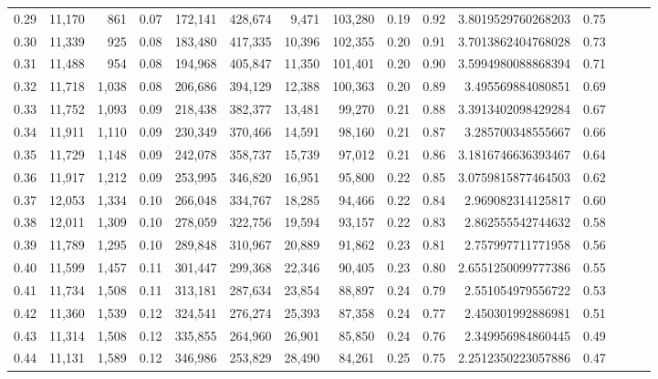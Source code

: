 \begin{tabular}{rrrrrrrrrrrrrrr}
0.29 &  11,170 &    861 &  0.07 &  172,141 &  428,674 &    9,471 &  103,280 &  0.19 &  0.92 &     3.8019529760268203 &      0.75 \\
0.30 &  11,339 &    925 &  0.08 &  183,480 &  417,335 &   10,396 &  102,355 &  0.20 &  0.91 &     3.7013862404768028 &      0.73 \\
0.31 &  11,488 &    954 &  0.08 &  194,968 &  405,847 &   11,350 &  101,401 &  0.20 &  0.90 &     3.5994980088868394 &      0.71 \\
0.32 &  11,718 &  1,038 &  0.08 &  206,686 &  394,129 &   12,388 &  100,363 &  0.20 &  0.89 &      3.495569884080851 &      0.69 \\
0.33 &  11,752 &  1,093 &  0.09 &  218,438 &  382,377 &   13,481 &   99,270 &  0.21 &  0.88 &     3.3913402098429284 &      0.67 \\
0.34 &  11,911 &  1,110 &  0.09 &  230,349 &  370,466 &   14,591 &   98,160 &  0.21 &  0.87 &      3.285700348555667 &      0.66 \\
0.35 &  11,729 &  1,148 &  0.09 &  242,078 &  358,737 &   15,739 &   97,012 &  0.21 &  0.86 &     3.1816746636393467 &      0.64 \\
0.36 &  11,917 &  1,212 &  0.09 &  253,995 &  346,820 &   16,951 &   95,800 &  0.22 &  0.85 &     3.0759815877464503 &      0.62 \\
0.37 &  12,053 &  1,334 &  0.10 &  266,048 &  334,767 &   18,285 &   94,466 &  0.22 &  0.84 &      2.969082314125817 &      0.60 \\
0.38 &  12,011 &  1,309 &  0.10 &  278,059 &  322,756 &   19,594 &   93,157 &  0.22 &  0.83 &      2.862555542744632 &      0.58 \\
0.39 &  11,789 &  1,295 &  0.10 &  289,848 &  310,967 &   20,889 &   91,862 &  0.23 &  0.81 &      2.757997711771958 &      0.56 \\
0.40 &  11,599 &  1,457 &  0.11 &  301,447 &  299,368 &   22,346 &   90,405 &  0.23 &  0.80 &     2.6551250099777386 &      0.55 \\
0.41 &  11,734 &  1,508 &  0.11 &  313,181 &  287,634 &   23,854 &   88,897 &  0.24 &  0.79 &      2.551054979556722 &      0.53 \\
0.42 &  11,360 &  1,539 &  0.12 &  324,541 &  276,274 &   25,393 &   87,358 &  0.24 &  0.77 &      2.450301992886981 &      0.51 \\
0.43 &  11,314 &  1,508 &  0.12 &  335,855 &  264,960 &   26,901 &   85,850 &  0.24 &  0.76 &      2.349956984860445 &      0.49 \\
0.44 &  11,131 &  1,589 &  0.12 &  346,986 &  253,829 &   28,490 &   84,261 &  0.25 &  0.75 &     2.2512350223057886 &      0.47 \\

\end{tabular}
